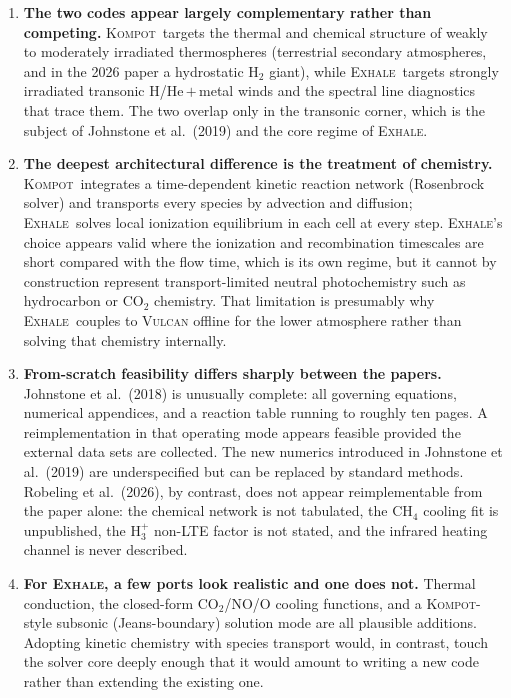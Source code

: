 \documentclass{my_memo}
\newcommand{\EXHALE}{\textsc{Exhale}}
\newcommand{\Kompot}{\textsc{Kompot}}
\begin{document}
\begin{enumerate}
  \item \textbf{The two codes appear largely complementary rather than competing.} \Kompot\
    targets the thermal and chemical structure of weakly to moderately irradiated thermospheres
    (terrestrial secondary atmospheres, and in the 2026 paper a hydrostatic H$_2$ giant),
    while \EXHALE\ targets strongly irradiated transonic H/He\,$+$\,metal winds and the
    spectral line diagnostics that trace them. The two overlap only in the transonic corner,
    which is the subject of Johnstone et al.\ (2019) and the core regime of \EXHALE.

  \item \textbf{The deepest architectural difference is the treatment of chemistry.} \Kompot\
    integrates a time-dependent kinetic reaction network (Rosenbrock solver) and transports every
    species by advection and diffusion; \EXHALE\ solves local ionization equilibrium in each cell
    at every step. \EXHALE's choice appears valid where the ionization and recombination
    timescales are short compared with the flow time, which is its own regime, but it cannot by
    construction represent transport-limited neutral photochemistry such as hydrocarbon or
    CO$_2$ chemistry. That limitation is presumably why \EXHALE\ couples to \textsc{Vulcan}
    offline for the lower atmosphere rather than solving that chemistry internally.

  \item \textbf{From-scratch feasibility differs sharply between the papers.} Johnstone et al.\
    (2018) is unusually complete: all governing equations, numerical appendices, and a reaction
    table running to roughly ten pages. A reimplementation in that operating mode appears
    feasible provided the external data sets are collected. The new numerics introduced in
    Johnstone et al.\ (2019) are underspecified but can be replaced by standard methods. Robeling
    et al.\ (2026), by contrast, does not appear reimplementable from the paper alone: the
    chemical network is not tabulated, the CH$_4$ cooling fit is unpublished, the H$_3^+$
    non-LTE factor is not stated, and the infrared heating channel is never described.

  \item \textbf{For \EXHALE, a few ports look realistic and one does not.} Thermal conduction,
    the closed-form CO$_2$/NO/O cooling functions, and a \Kompot-style subsonic (Jeans-boundary)
    solution mode are all plausible additions. Adopting kinetic chemistry with species transport
    would, in contrast, touch the solver core deeply enough that it would amount to writing a new
    code rather than extending the existing one.
\end{enumerate}
\end{document}

